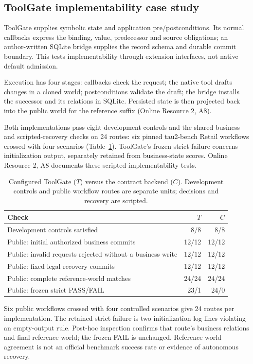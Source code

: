 \documentclass[pdflatex,sn-basic]{sn-jnl}
\begin{document}
\subsection{ToolGate implementability case study}\label{configured-toolgate-on-public-reference-workflows}

ToolGate \citep{toolgate} supplies symbolic state and application pre/postconditions. Its normal callbacks express the binding, value, predecessor and source obligations; an author-written SQLite bridge supplies the record schema and durable commit boundary. This tests implementability through extension interfaces, not native default admission.

Execution has four stages: callbacks check the request; the native tool drafts changes in a cloned world; postconditions validate the draft; the bridge installs the successor and its relations in SQLite. Persisted state is then projected back into the public world for the reference suffix (Online Resource 2, A8).

Both implementations pass eight development controls and the shared business and scripted-recovery checks on 24 routes: six pinned tau2-bench Retail workflows \citep{tau2-bench} crossed with four scenarios (Table~\ref{tab:external}). ToolGate's frozen strict failure concerns initialization output, separately retained from business-state scores. Online Resource 2, A8 documents these scripted implementability tests.

\begin{table}[tbp]
\caption{Configured ToolGate ($T$) versus the contract backend ($C$). Development controls and public workflow routes are separate units; decisions and recovery are scripted.}
\label{tab:external}
\centering\small
\begin{tabularx}{\textwidth}{@{}Xrr@{}}
\toprule
Check & $T$ & $C$ \\
\midrule
Development controls satisfied & 8/8 & 8/8 \\
Public: initial authorized business commits & 12/12 & 12/12 \\
Public: invalid requests rejected without a business write & 12/12 & 12/12 \\
Public: fixed legal recovery commits & 12/12 & 12/12 \\
Public: complete reference-world matches & 24/24 & 24/24 \\
Public: frozen strict PASS/FAIL & 23/1 & 24/0 \\
\bottomrule
\end{tabularx}
\par\smallskip
\begin{minipage}{\textwidth}\small
Six public workflows crossed with four controlled scenarios give 24 routes per implementation.
The retained strict failure is two initialization log lines violating an empty-output rule.
Post-hoc inspection confirms that route's business relations and final reference world;
the frozen FAIL is unchanged. Reference-world agreement is not an official benchmark
success rate or evidence of autonomous recovery.
\end{minipage}
\end{table}
\end{document}
